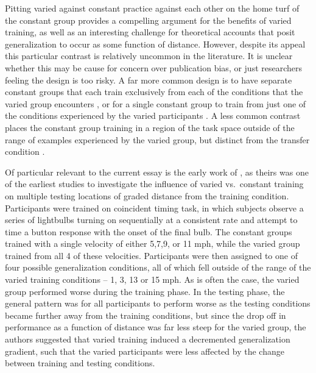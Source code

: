 \documentclass[
  12pt,
  letterpaper,
]{article}
\begin{document}
Pitting varied against constant practice against each other on the home
turf of the constant group provides a compelling argument for the
benefits of varied training, as well as an interesting challenge for
theoretical accounts that posit generalization to occur as some function
of distance. However, despite its appeal this particular contrast is
relatively uncommon in the literature. It is unclear whether this may be
cause for concern over publication bias, or just researchers feeling the
design is too risky. A far more common design is to have separate
constant groups that each train exclusively from each of the conditions
that the varied group encounters
\autocite{catalanoDistantTransferCoincident1984a,chuaPracticeVariabilityPromotes2019,newellVariabilityPracticeTransfer1976,moxleySchemaVariabilityPractice1979,mccrackenTestSchemaTheory1977},
or for a single constant group to train from just one of the conditions
experienced by the varied participants
\autocite{pigottMotorSchemaStructure1984,rollerVariablePracticeLenses2001,wrisbergTrainingProductionNovel1984,wrisbergDevelopingCoincidentTiming1983}.
A less common contrast places the constant group training in a region of
the task space outside of the range of examples experienced by the
varied group, but distinct from the transfer condition
\autocite{wrisbergVariabilityPracticeHypothesis1987,wulfVariabilityPracticeImplicit1997}.

Of particular relevant to the current essay is the early work of
\textcite{catalanoDistantTransferCoincident1984a}, as theirs was one of
the earliest studies to investigate the influence of varied vs.~constant
training on multiple testing locations of graded distance from the
training condition. Participants were trained on coincident timing task,
in which subjects observe a series of lightbulbs turning on sequentially
at a consistent rate and attempt to time a button response with the
onset of the final bulb. The constant groups trained with a single
velocity of either 5,7,9, or 11 mph, while the varied group trained from
all 4 of these velocities. Participants were then assigned to one of
four possible generalization conditions, all of which fell outside of
the range of the varied training conditions -- 1, 3, 13 or 15 mph. As is
often the case, the varied group performed worse during the training
phase. In the testing phase, the general pattern was for all
participants to perform worse as the testing conditions became further
away from the training conditions, but since the drop off in performance
as a function of distance was far less steep for the varied group, the
authors suggested that varied training induced a decremented
generalization gradient, such that the varied participants were less
affected by the change between training and testing conditions.
\end{document}

